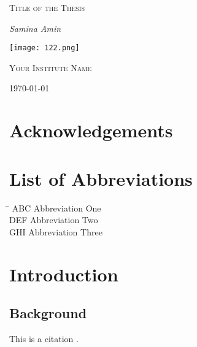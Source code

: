 \documentclass[12pt]{report}
\begin{document}
\begin{titlepage}
    \centering
 
    {\scshape\Large Title of the Thesis\par}
    \vspace{1.5cm}
    {\Large\itshape Samina Amin\par}
    \vfill

 \vspace{0.5cm}
   \texttt{[image: 122.png]}\par\vspace{1cm} %
    {\scshape\LARGE Your Institute Name \par}
    {\large \today\par}
   
\end{titlepage}

\begin{abstract}
\lipsum[1] %
\end{abstract}

\chapter*{Acknowledgements}
\lipsum[1] %



\tableofcontents
\listoffigures
\listoftables

\chapter*{List of Abbreviations}
\begin{tabbing}
    \hspace{2cm} \= \kill
    ABC \> Abbreviation One \\
    DEF \> Abbreviation Two \\
    GHI \> Abbreviation Three \\
\end{tabbing}

\chapter{Introduction}
\section{Background}
This is a citation \cite{smith2020}.
\lipsum[1] %
\end{document}
